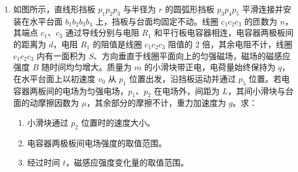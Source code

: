 \documentclass[\gkver]{gaokaozhenti}
\begin{document}
\begin{enumerate}
{$P_0=F_0v_1$ ④

$F-mg=ma$ ⑤

$v_1=at_1$ ⑥

由③④⑤⑥，代入数据，得：$t_1=5\Us$ ⑦

$t=2\Us$ 时，重物处于匀加速运动阶段，设此时速度为 $v_2$，输出功率为 $P$，则

$v_2=at$ ⑧

$P=Fv_2$ ⑨

由⑤⑧⑨，代入数据，得：$P=2.04\times10^{4}\UW$。
}

\item
如图所示，直线形挡板 $p_1p_2p_3$ 与半径为 $r$ 的圆弧形挡板 $p_3p_4p_5$ 平滑连接并安装在水平台面 $b_1b_2b_3b_4$ 上，挡板与台面均固定不动。线圈 $c_1c_2c_3$ 的匝数为 $n$，其端点 $c_1$、$c_3$ 通过导线分别与电阻 $R_1$ 和平行板电容器相连，电容器两极板间的距离为 $d$，电阻 $R_1$ 的阻值是线圈 $c_1c_2c_3$ 阻值的 2 倍，其余电阻不计，线圈 $c_1c_2c_3$ 内有一面积为 $S$、方向垂直于线圈平面向上的匀强磁场，磁场的磁感应强度 $B$ 随时间均匀增大。质量为 $m$ 的小滑块带正电，电荷量始终保持为 $q$，在水平台面上以初速度 $v_0$ 从 $p_1$ 位置出发，沿挡板运动并通过 $p_5$ 位置。若电容器两板间的电场为匀强电场，$p_1$、$p_2$ 在电场外，间距为 $L$，其间小滑块与台面的动摩擦因数为 $\mu$，其余部分的摩擦不计，重力加速度为 $g$。求：

\begin{enumerate}
	\item
	小滑块通过 $p_{2}$ 位置时的速度大小。
	\item
	电容器两极板间电场强度的取值范围。
	\item
	经过时间 $t$，磁感应强度变化量的取值范围。
\end{enumerate}



\end{enumerate}
\end{document}

